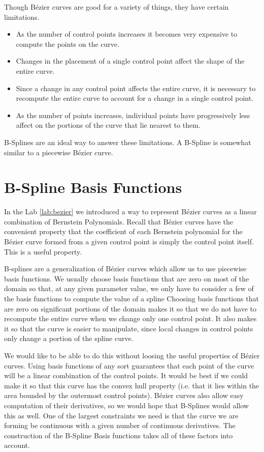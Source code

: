 Though B\'{e}zier curves are good for a variety of things, they have certain limitations.
\begin{itemize}
\item As the number of control points increases it becomes very expensive to compute the points on the curve.
\item Changes in the placement of a single control point affect the shape of the entire curve.
\item Since a change in any control point affects the entire curve, it is necessary to recompute the entire curve to account for a change in a single control point.
\item As the number of points increases, individual points have progressively less affect on the portions of the curve that lie nearest to them.
\end{itemize}

B-Splines are an ideal way to answer these limitations.
A B-Spline is somewhat similar to a piecewise B\'{e}zier curve.

\section*{B-Spline Basis Functions}

In the Lab \ref{lab:bezier} we introduced a way to represent B\'{e}zier curves as a linear combination of Bernstein Polynomials.
Recall that B\'{e}zier curves have the convenient property that the coefficient of each Bernstein polynomial for the B\'{e}zier curve formed from a given control point is simply the control point itself.
This is a useful property.

B-splines are a generalization of B\'{e}zier curves which allow us to use piecewise basis functions.
We usually choose basis functions that are zero on most of the domain so that, at any given parameter value, we only have to consider a few of the basis functions to compute the value of a spline
Choosing basis functions that are zero on significant portions of the domain makes it so that we do not have to recompute the entire curve when we change only one control point.
It also makes it so that the curve is easier to manipulate, since local changes in control points only change a portion of the spline curve.

We would like to be able to do this without loosing the useful properties of B\'{e}zier curves.
Using basis functions of any sort guarantees that each point of the curve will be a linear combination of the control points.
It would be best if we could make it so that this curve has the convex hull property (i.e. that it lies within the area bounded by the outermost control points).
B\'{e}zier curves also allow easy computation of their derivatives, so we would hope that B-Splines would allow this as well.
One of the largest constraints we need is that the curve we are forming be continuous with a given number of continuous derivatives.
The construction of the B-Spline Basis functions takes all of these factors into account.

